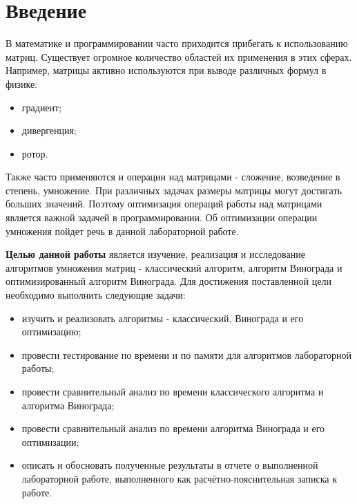 \chapter*{Введение}

В математике и программировании часто приходится прибегать к использованию матриц. Существует огромное количество областей их применения в этих сферах. Например, матрицы активно используются при выводе различных формул в физике:

\begin{itemize}
    \item градиент;
    \item дивергенция;
    \item ротор.
\end{itemize}

Также часто применяются и операции над матрицами - сложение, возведение в степень, умножение. При различных задачах размеры матрицы могут достигать больших значений. Поэтому оптимизация операций работы над матрицами является важной задачей в программировании. Об оптимизации операции умножения пойдет речь в данной лабораторной работе.


\textbf{Целью данной работы} является изучение, реализация и исследование алгоритмов умножения матриц - классический алгоритм, алгоритм Винограда и оптимизированный алгоритм Винограда. 
Для достижения поставленной цели необходимо выполнить следующие задачи:
\begin{itemize}
	\item изучить и реализовать алгоритмы - классический, Винограда и его оптимизацию;
    \item провести тестирование по времени и по памяти для алгоритмов лабораторной работы;
    \item провести сравнительный анализ по времени классического алгоритма и алгоритма Винограда;
    \item провести сравнительный анализ по времени алгоритма Винограда и его оптимизации;
	\item описать и обосновать полученные результаты в отчете о выполненной лабораторной работе, выполненного как расчётно-пояснительная записка к работе.
\end{itemize}
